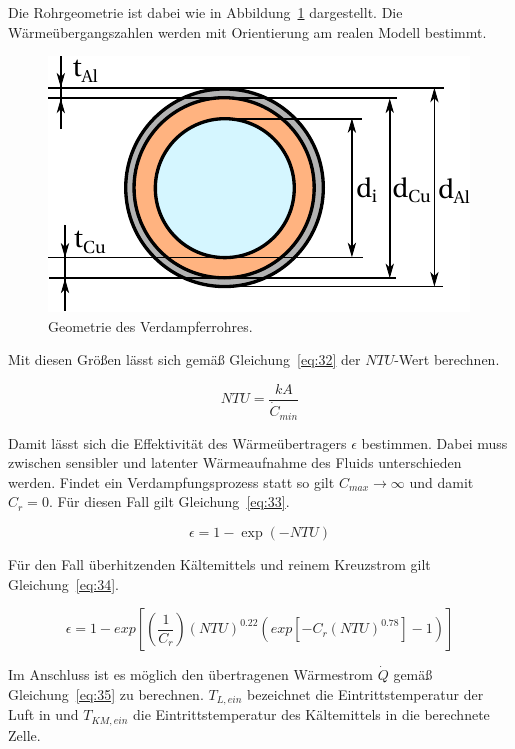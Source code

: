 Die Rohrgeometrie ist dabei wie in Abbildung~\ref{fig:Geometrie} dargestellt.
Die Wärmeübergangszahlen werden mit Orientierung am realen Modell bestimmt.

\begin{figure}[h]
\centering
\includegraphics[scale=1]{Pictures/Rohrgeometrie.pdf}
\caption{Geometrie des Verdampferrohres.}
\label{fig:Geometrie}
\end{figure}



Mit diesen Größen lässt sich gemäß Gleichung~\ref{eq:32} der $NTU$-Wert berechnen.

\begin{equation}
\label{eq:32}
NTU = \frac{kA}{\dot{C}_{min}}
\end{equation}

Damit lässt sich die Effektivität des Wärmeübertragers $\epsilon$ bestimmen.
Dabei muss zwischen sensibler und latenter Wärmeaufnahme des Fluids unterschieden werden.
Findet ein Verdampfungsprozess statt so gilt $C_{max}\longrightarrow\infty$ und damit $C_r =0$. Für diesen Fall gilt Gleichung~\ref{eq:33}.

\begin{equation}
\label{eq:33}
\epsilon = 1- \exp{(-NTU)}
\end{equation}

Für den Fall überhitzenden Kältemittels und reinem Kreuzstrom gilt Gleichung~\ref{eq:34}.

\begin{equation}
\label{eq:34}
\epsilon = 1- exp{\left[\left(\frac{1}{C_r}\right)(NTU)^{0.22}(exp{[-C_r(NTU)^{0.78}]}-1)\right]}
\end{equation}

\clearpage

Im Anschluss ist es  möglich den übertragenen Wärmestrom $\dot{Q}$ gemäß Gleichung~\ref{eq:35} zu berechnen. $T_{L,ein}$ bezeichnet die Eintrittstemperatur der Luft in und $T_{KM,ein}$ die Eintrittstemperatur des Kältemittels in die berechnete Zelle.

